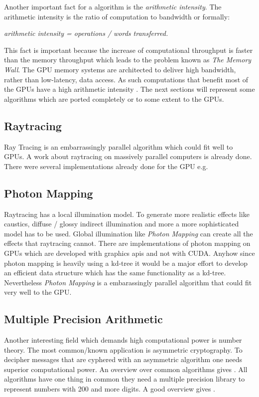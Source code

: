 Another important fact for a algorithm is the \emph{arithmetic intensity}. The
arithmetic intensity is the ratio of computation to bandwidth or formally:
\begin{center} 
 \emph{arithmetic intensity = operations / words transferred.}
\end{center}
This fact is important because the increase of computational throughput is
faster than the memory throughput which leads to the problem known as \emph{The
Memory Wall}. The \gls{GPU} memory systems are architected to deliver high bandwidth,
rather than low-latency, data access. As such computations that benefit most of
the \glspl{GPU} have a high arithmetic intensity \citep{citeulike:3733428}. The next 
sections will represent some algorithms which are ported completely or to some 
extent to the \glspl{GPU}.

\subsection{Raytracing} %
\label{par:ray_tracing}
Ray Tracing \citep{citeulike:841961} is an embarrassingly parallel algorithm which
could fit well to \glspl{GPU}. A work about raytracing on
massively parallel computers \citep{citeulike:80546} is already done. 
There were several implementations already done for the GPU e.g. 

\subsection{Photon Mapping} %
\label{par:photon_mapping}
Raytracing has a local illumination model. To generate more realistic effects
like caustics, diffuse / glossy indirect illumination and more a more
sophisticated model has to be used. Global illumination like \emph{Photon
Mapping} \citep{citeulike:635695} can create all the effects that raytracing
cannot. There are implementations of photon mapping on GPUs
\citep{Purcell:2003:PMO} which are developed with graphics apis and not with
\gls{CUDA}. Anyhow since photon mapping is heavily using a kd-tree it would be a major
effort to develop an efficient data structure which has the same functionality
as a kd-tree. Nevertheless \emph{Photon Mapping} is a embarassingly parallel 
algorithm that could fit very well to the \gls{GPU}.


\subsection{Multiple Precision Arithmetic} %
\label{par:multiple_precision_arithmetic}
Another interesting field which demands high computational power is number
theory. The most common/known application is asymmetric cryptography. To
decipher messages that are cyphered with an asymmetric algorithm one needs
superior computational power. An overview over common algorithms gives
\citep{citeulike:3783254}. All algorithms have one thing in common they need a
multiple precision library to represent numbers with 200 and more digits. A good
overview gives \citep{citeulike:3783244}.

